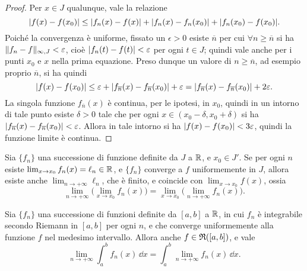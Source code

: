 \begin{proof}
	Per $x\in J$ qualunque, vale la relazione
	\begin{equation}
		\lvert f(x)-f(x_0)\rvert\leq\lvert f_n(x)-f(x)\rvert+\lvert f_n(x)-f_n(x_0)\rvert+\lvert f_n(x_0)-f(x_0)\rvert.
	\end{equation}
	Poiché la convergenza è uniforme, fissato un $\epsilon>0$ esiste $\overline{n}$ per cui $\forall n\geq\overline{n}$ si ha $\lVert f_n-f\rVert_{\infty,J}<\varepsilon$, cioè $\lvert f_n(t)-f(t)\rvert<\varepsilon$ per ogni $t\in J$; quindi vale anche per i punti $x_0$ e $x$ nella prima equazione. Preso dunque un valore di $n\geq\overline{n}$, ad esempio proprio $\overline{n}$, si ha quindi
	\begin{equation}
		\lvert f(x)-f(x_0)\rvert\leq\varepsilon+\lvert f_{\overline n}(x)-f_{\overline n}(x_0)\rvert+\varepsilon=\lvert f_{\overline n}(x)-f_{\overline n}(x_0)\rvert+2\varepsilon.
	\end{equation}
	La singola funzione $f_{\overline n}(x)$ è continua, per le ipotesi, in $x_0$, quindi in un intorno di tale punto esiste $\delta>0$ tale che per ogni $x\in(x_0-\delta,x_0+\delta)$ si ha $\lvert f_{\overline n}(x)-f_{\overline n}(x_0)\rvert<\varepsilon$.
	Allora in tale intorno si ha $\lvert f(x)-f(x_0)\rvert<3\varepsilon$, quindi la funzione limite è continua.
\end{proof}
\begin{teorema} \label{t:doppio_limite}
Sia $\{f_n\}$ una successione di funzione definite da $J$ a $\mathbb{R}$, e $x_0\in J'$. Se per ogni $n$ esiste $\lim_{x\to x_0}f_n(x)=\ell_n\in\mathbb{R}$, e $\{f_n\}$ converge a $f$ uniformemente in $J$, allora esiste anche $\lim_{n\to+\infty}\ell_n$, che è finito, e coincide con $\lim_{x\to x_0}f(x)$, ossia
\begin{equation} \label{eq:doppio_limite}
\lim_{n\to+\infty}\Big(\lim_{x\to x_0}f_n(x)\Big)=\lim_{x\to x_0}\Big(\lim_{n\to+\infty}f_n(x)\Big).
\end{equation}
\end{teorema}
\begin{teorema} \label{t:scambio_integrale_limite}
Sia $\{f_n\}$ una successione di funzioni definite da $[a,b]$ a $\mathbb{R}$, in cui $f_n$ è integrabile secondo Riemann in $[a,b]$ per ogni $n$, e che converge uniformemente alla funzione $f$ nel medesimo intervallo. Allora anche $f\in\mathfrak{R}([a,b])$, e vale
\begin{equation} \label{eq:scambio_integrale_limite}
\lim_{n\to+\infty}\int_a^bf_n(x)\,\dd x=\int_a^b\lim_{n\to+\infty}f_n(x)\,\dd x.
\end{equation}
\end{teorema}
